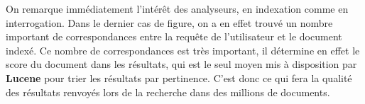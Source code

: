 On remarque immédiatement l’intérêt des analyseurs, en indexation comme en interrogation. Dans le dernier cas de figure, on a en effet trouvé un nombre important de correspondances entre la requête de l’utilisateur et le document indexé. Ce nombre de correspondances est très important, il détermine en effet le score du document dans les résultats, qui est le seul moyen mis à disposition par \textbf{Lucene} pour trier les résultats par pertinence. C’est donc ce qui fera la qualité des résultats renvoyés lors de la recherche dans des millions de documents.





